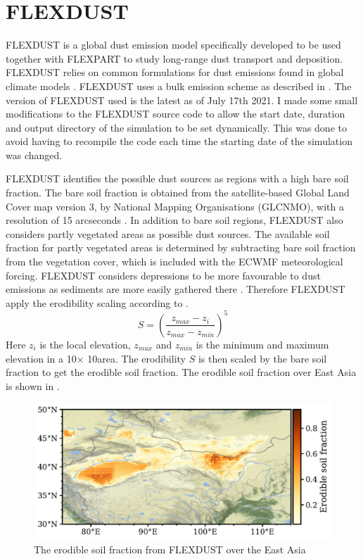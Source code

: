 \section{FLEXDUST}\label{sec:flexdust}
FLEXDUST is a global dust emission model specifically developed to be used together 
with FLEXPART to study long-range dust transport and deposition. FLEXDUST relies on common 
formulations for dust emissions found in global climate models \parencite{flexdust_ref_2016}.
FLEXDUST uses a bulk emission scheme as described in .
The version of FLEXDUST used is the latest as of July 17th 2021. 
I made some small modifications to the FLEXDUST source code to allow the start date, duration and output directory of the simulation to be set dynamically. 
This was done to avoid having to recompile the code each time the starting date of the simulation was changed.  

FLEXDUST identifies the possible dust sources as regions with a high bare soil fraction. 
The bare soil fraction is obtained from the satellite-based Global Land Cover map version 3, by National Mapping Organisations (GLCNMO), with a 
resolution of 15 arcseconds \parencite{shirahata2017production}.
In addition to bare soil regions, FLEXDUST also considers partly vegetated areas as possible
dust sources. The available soil fraction for partly vegetated areas is determined by
subtracting bare soil fraction from the vegetation cover, which is included with the ECWMF meteorological forcing.
FLEXDUST considers depressions to be more favourable to dust emissions as sediments are more easily gathered there \parencite{zender2003mineral}. Therefore FLEXDUST apply the erodibility scaling 
 according to \textcite{dust_dist_Ginoux2001}. 
\begin{equation}\label{eq_ero_soil_frac}
    S = \left(\frac{z_{max} - z_i}{z_{max} - z_{min}}\right)^5 
\end{equation}    
Here $z_i$ is the local elevation, $z_{max}$ and $z_{min}$ is the minimum and
maximum elevation in a 10\degree $\times$ 10\degree area.  The erodibility $S$ is
then scaled by the bare soil fraction to get the erodible soil fraction. The erodible soil fraction over East Asia is shown in . 
\begin{figure}[hptb]
    \centering
    \includegraphics[width=\textwidth]{../figs/erodible_soil_fraction.pdf}
    \caption{The erodible soil fraction from FLEXDUST over the East Asia}
    \label{fig:erodible_soil_fraction_EA}
\end{figure}

